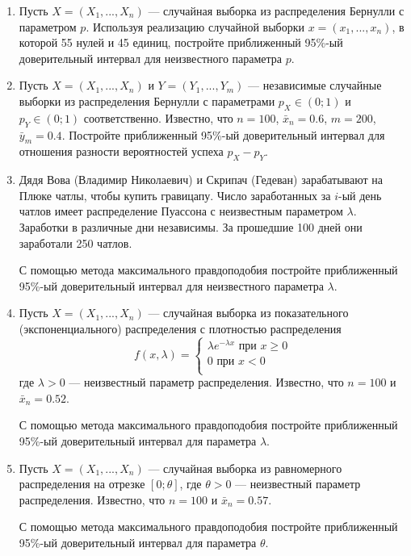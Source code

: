 \documentclass[12pt]{article}
\begin{document}
\begin{enumerate}
\item Пусть $X = (X_{1},..., X_{n})$ — случайная выборка из распределения Бернулли с параметром $p$. Используя реализацию случайной выборки $x = (x_{1},..., x_{n})$, в которой 55 нулей и 45 единиц, постройте приближенный 95\%-ый доверительный интервал для неизвестного параметра $p$.

\item Пусть $X = (X_{1},..., X_{n})$ и $Y = (Y_{1},..., Y_{m})$ — независимые случайные
выборки из распределения Бернулли с параметрами $p_{X} \in (0;1)$ и $p_{Y} \in (0;1)$ соответственно. Известно, что $n = 100$, $\bar{x}_{n} = 0.6$, $m = 200$, $\bar{y}_{m} = 0.4$. Постройте приближенный 95\%-ый доверительный интервал для отношения разности вероятностей успеха $p_{X} - p_{Y}$.

\item Дядя Вова (Владимир Николаевич) и Скрипач (Гедеван) зарабатывают на Плюке чатлы, чтобы купить гравицапу. Число заработанных за $i$-ый день чатлов имеет распределение Пуассона с неизвестным параметром $\lambda$. Заработки в различные дни независимы. За прошедшие 100 дней они заработали 250 чатлов. 

С помощью метода максимального правдоподобия постройте приближенный 95\%-ый доверительный интервал для неизвестного параметра $\lambda$.

\item Пусть $X = (X_{1},..., X_{n})$ — случайная выборка из показательного (экспоненциального) распределения с плотностью распределения
\[
f(x,\lambda)=
\begin{cases}
\lambda e^{-\lambda x}\text{ при } x\geq 0 \\
0 \text{ при } x < 0 \\
\end{cases}
\]
где $\lambda > 0$ — неизвестный параметр распределения. Известно, что $n = 100$ и $\bar{x}_n = 0.52$. 

С помощью метода максимального правдоподобия постройте приближенный 95\%-ый доверительный интервал для параметра $\lambda$.

\item Пусть $X = (X_{1},..., X_{n})$  — случайная выборка из равномерного распределения на отрезке $[0; \theta]$, где  $\theta > 0$ — неизвестный параметр распределения. Известно, что $n = 100$ и $\bar{x}_n = 0.57$. 

С помощью метода максимального правдоподобия постройте приближенный 95\%-ый доверительный интервал для параметра $\theta$.


\end{enumerate}
\end{document}
